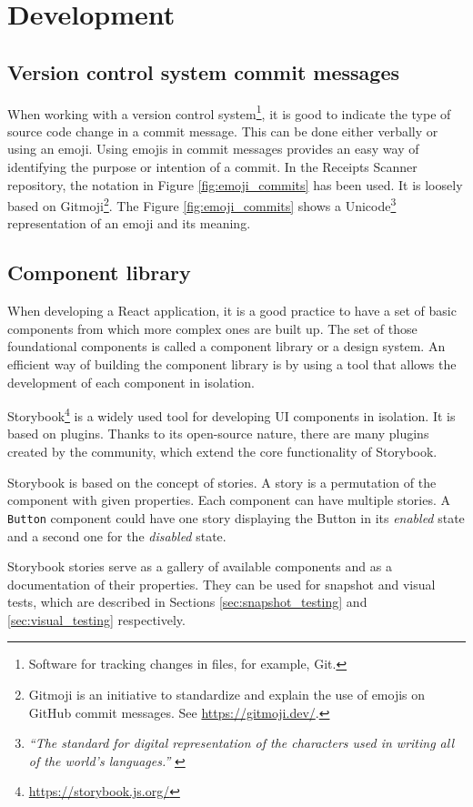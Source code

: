 \documentclass[
  printed, %
  table,   %
  oneside, %
  lof,     %
  lot,     %
]{fithesis3}
\begin{document}
\chapter{Development}
\section{Version control system commit messages}
When working with a version control system\footnote{Software for tracking changes in files, for example, Git.}, it is good to indicate the type of source code change in a commit message. This can be done either verbally or using an emoji.
Using emojis in commit messages provides an easy way of identifying the purpose or intention of a commit. In the Receipts Scanner repository, the notation in Figure \ref{fig:emoji_commits} has been used. It is loosely based on Gitmoji\footnote{Gitmoji is an initiative to standardize and explain the use of emojis on GitHub commit messages. See \url{https://gitmoji.dev/}.}. The Figure \ref{fig:emoji_commits} shows a Unicode\footnote{\textit{``The standard for digital representation of the characters used in writing all of the world's languages.''} \cite{Unicode}} representation of an emoji and its meaning.

\section{Component library}
\label{sec:component_library}
When developing a React application, it is a good practice to have a set of basic components from which more complex ones are built up. The set of those foundational components is called a component library or a design system. An efficient way of building the component library is by using a tool that allows the development of each component in isolation. 

Storybook\footnote{\url{https://storybook.js.org/}} is a widely used tool for developing UI components in isolation. It is based on plugins. Thanks to its open-source nature, there are many plugins created by the community, which extend the core functionality of Storybook.

Storybook is based on the concept of stories. A story is a permutation of the component with given properties. Each component can have multiple stories. A \texttt{Button} component could have one story displaying the Button in its \textit{enabled} state and a second one for the \textit{disabled} state.

Storybook stories serve as a gallery of available components and as a documentation of their properties. They can be used for snapshot and visual tests, which are described in Sections \ref{sec:snapshot_testing} and \ref{sec:visual_testing} respectively.
\end{document}
